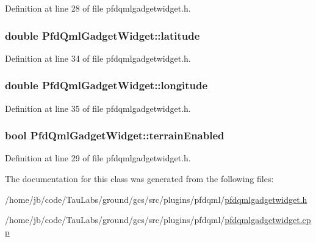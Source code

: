 \-Definition at line 28 of file pfdqmlgadgetwidget.\-h.

\hypertarget{class_pfd_qml_gadget_widget_a72c9413b6d8fcd5901d69e41ab87e77a}{
\subsubsection[{latitude}]{\setlength{\rightskip}{0pt plus 5cm}double {\bf \-Pfd\-Qml\-Gadget\-Widget\-::latitude}}}\label{class_pfd_qml_gadget_widget_a72c9413b6d8fcd5901d69e41ab87e77a}


\-Definition at line 34 of file pfdqmlgadgetwidget.\-h.

\hypertarget{class_pfd_qml_gadget_widget_a37f3fe5251a59848388a2032bf09e5ce}{
\subsubsection[{longitude}]{\setlength{\rightskip}{0pt plus 5cm}double {\bf \-Pfd\-Qml\-Gadget\-Widget\-::longitude}}}\label{class_pfd_qml_gadget_widget_a37f3fe5251a59848388a2032bf09e5ce}


\-Definition at line 35 of file pfdqmlgadgetwidget.\-h.

\hypertarget{class_pfd_qml_gadget_widget_afee0f7d6409cb17f5c6ea25b873630e0}{
\subsubsection[{terrain\-Enabled}]{\setlength{\rightskip}{0pt plus 5cm}bool {\bf \-Pfd\-Qml\-Gadget\-Widget\-::terrain\-Enabled}}}\label{class_pfd_qml_gadget_widget_afee0f7d6409cb17f5c6ea25b873630e0}


\-Definition at line 29 of file pfdqmlgadgetwidget.\-h.



\-The documentation for this class was generated from the following files\-:\begin{DoxyCompactItemize}
\item 
/home/jb/code/\-Tau\-Labs/ground/gcs/src/plugins/pfdqml/\hyperlink{pfdqmlgadgetwidget_8h}{pfdqmlgadgetwidget.\-h}\item 
/home/jb/code/\-Tau\-Labs/ground/gcs/src/plugins/pfdqml/\hyperlink{pfdqmlgadgetwidget_8cpp}{pfdqmlgadgetwidget.\-cpp}\end{DoxyCompactItemize}
